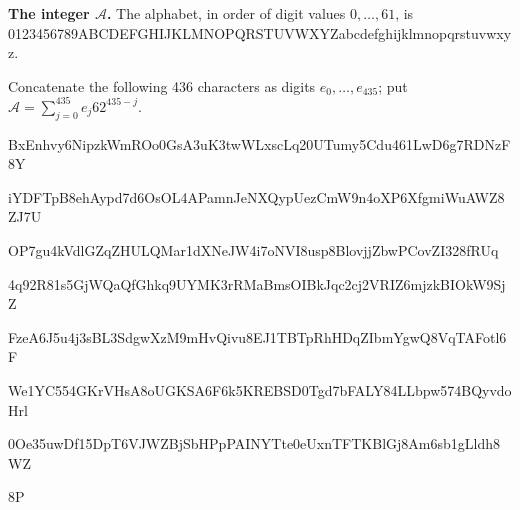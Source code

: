 \textbf{The integer $\mathcal A$.}
The alphabet, in order of digit values $0,\ldots,61$, is
{\fontsize{9}{10}\selectfont\ttfamily 0123456789ABCDEFGHIJKLMNOPQRSTUVWXYZabcdefghijklmnopqrstuvwxyz}.\par
Concatenate the following 436 characters as digits $e_0,\ldots,e_{435}$;
put $\mathcal A=\sum_{j=0}^{435}e_j62^{435-j}$.\par
\begingroup\fontsize{9}{10}\selectfont\ttfamily
BxEnhvy6NipzkWmROo0GsA3uK3twWLxscLq20UTumy5Cdu461LwD6g7RDNzF8Y\par
iYDFTpB8ehAypd7d6OsOL4APamnJeNXQypUezCmW9n4oXP6XfgmiWuAWZ8ZJ7U\par
OP7gu4kVdlGZqZHULQMar1dXNeJW4i7oNVI8usp8BlovjjZbwPCovZI328fRUq\par
4q92R81s5GjWQaQfGhkq9UYMK3rRMaBmsOIBkJqc2cj2VRIZ6mjzkBIOkW9SjZ\par
FzeA6J5u4j3sBL3SdgwXzM9mHvQivu8EJ1TBTpRhHDqZIbmYgwQ8VqTAFotl6F\par
We1YC554GKrVHsA8oUGKSA6F6k5KREBSD0Tgd7bFALY84LLbpw574BQyvdoHrl\par
0Oe35uwDf15DpT6VJWZBjSbHPpPAINYTte0eUxnTFTKBlGj8Am6sb1gLldh8WZ\par
8P\par
\endgroup

\endgroup
